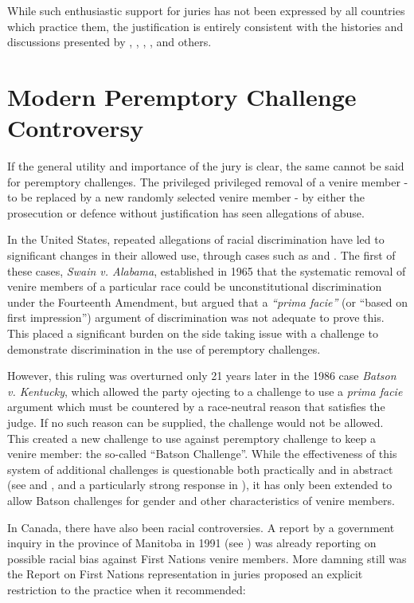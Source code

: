 While such enthusiastic support for juries has not been expressed by all countries which practice them, the justification is
entirely consistent with the histories and discussions presented by \cite{hoffman1997}, \cite{vonmosch1921}, \cite{hansvidjudging},
\cite{vandykejurysel}, and others.

\section{Modern Peremptory Challenge Controversy} \label{sec:modper}

If the general utility and importance of the jury is clear, the same cannot be said for peremptory challenges. The privileged
privileged removal of a venire member - to be replaced by a new randomly selected venire member -  by either the prosecution or
defence without justification has seen allegations of abuse.

In the United States, repeated allegations of racial discrimination have led to significant changes in their allowed use, through
cases such as \cite{swainvalabama} and \cite{batsonvkentucky}. The first of these cases, \textit{Swain v. Alabama},
established in 1965 that the systematic removal of venire members of a particular race could be unconstitutional discrimination
under the Fourteenth Amendment, but argued that a \textit{``prima facie''} (or ``based on first impression'') argument of
discrimination was not adequate to prove this. This placed a significant burden on the side taking issue with a challenge to
demonstrate discrimination in the use of peremptory challenges.

However, this ruling was overturned only 21 years later in the 1986 case \textit{Batson v. Kentucky}, which allowed the
party ojecting to a challenge to use a \textit{prima facie} argument which must be countered by a race-neutral reason that
satisfies the judge. If no such reason can be supplied, the challenge would not be allowed. This created a new challenge to use
against peremptory challenge to keep a venire member: the so-called ``Batson Challenge''. While the effectiveness of this system
of additional challenges is questionable both practically and in abstract (see \cite{page2005} and \cite{morehead1994}, and a
particularly strong response in \cite{hoffman1997}), it has only been extended to allow Batson challenges for gender and other
characteristics of venire members.

In Canada, there have also been racial controversies. A report by a government inquiry in the province of Manitoba in 1991 (see 
\cite{goodfirststep}) was already reporting on possible racial bias against First Nations venire members. More damning still was
the \cite{iacobuccireport} Report on First Nations representation in juries proposed an explicit restriction to the practice when
it recommended:

